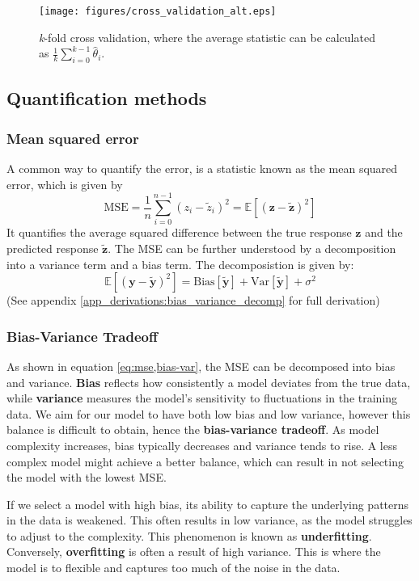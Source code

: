\documentclass{article}
\newcommand{\EE}{\mathbb{E}}
\begin{document}
\begin{multicols}{2}
\begin{figure}[H]
    \centering
    \texttt{[image: figures/cross\_validation\_alt.eps]}
    \caption{\textit{k}-fold cross validation, where the average statistic can be calculated as $\frac{1}{k}\sum_{i=0}^{k-1} \hat{\theta}_i$.}
    \label{fig:cross_validation}
\end{figure}

\subsection*{Quantification methods}
\subsubsection*{Mean squared error}
A common way to quantify the error, is a statistic known as the mean squared error, which is given by
$$\text{MSE} = \frac{1}{n} \sum_{i=0}^{n-1}(z_i - \tilde{z}_i)^2 = \EE[(\bm{z} - \bm{\tilde{z}})^2]$$
It quantifies the average squared difference between the true response $\bm{z}$ and the predicted response $\bm{\tilde{z}}$. The MSE can be further understood by a decomposition into a variance term and a bias term. The decomposistion is given by: 
\begin{equation} \label{eq:mse,bias-var}
  \EE[(\mathbf{y} - \mathbf{\tilde{y}})^2] = \text{Bias}[\mathbf{\tilde{y}}] + \text{Var}[\mathbf{\tilde{y}}] + \sigma^2  
\end{equation}
(See appendix \ref{app_derivations:bias_variance_decomp} for full derivation)

\subsubsection*{Bias-Variance Tradeoff} As shown in equation \ref{eq:mse,bias-var}, the MSE can be decomposed into bias and variance. \textbf{Bias} reflects how consistently a model deviates from the true data, while \textbf{variance} measures the model’s sensitivity to fluctuations in the training data. 
We aim for our model to have both low bias and low variance, however this balance is difficult to obtain, hence the \textbf{bias-variance tradeoff}. As model complexity increases, bias typically decreases and variance tends to rise. A less complex model might achieve a better balance, which can result in not selecting the model with the lowest MSE.

If we select a model with high bias, its ability to capture the underlying patterns in the data is weakened. This often results in low variance, as the model struggles to adjust to the complexity. This phenomenon is known as \textbf{underfitting}. Conversely, \textbf{overfitting} is often a result of high variance. This is where the model is to flexible and captures too much of the noise in the data. 


\end{multicols}
\end{document}
